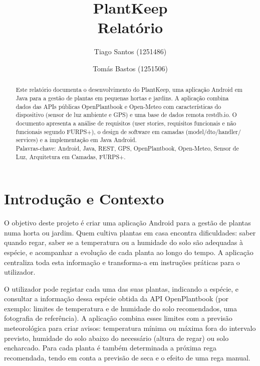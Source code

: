 \documentclass[runningheads,a4paper]{llncs}
\begin{document}
\mainmatter

\title{PlantKeep\\ Relatório}


\author{Tiago Santos (1251486) \and Tomás Bastos (1251506)}


\maketitle

\begin{abstract}
Este relatório documenta o desenvolvimento do PlantKeep, uma aplicação Android em
Java para a gestão de plantas em pequenas hortas e jardins. A aplicação combina dados
das APIs públicas OpenPlantbook e Open-Meteo com
características do dispositivo (sensor de luz ambiente e GPS) e uma
base de dados remota restdb.io. O documento
apresenta a análise de requisitos (user stories, requisitos funcionais e não
funcionais segundo FURPS+), o design de software em camadas (model/dto/handler/
services) e a implementação em Java Android.
\\[2mm]
Palavras-chave: Android, Java, REST, GPS, OpenPlantbook, Open-Meteo,
Sensor de Luz, Arquitetura em Camadas, FURPS+.
\end{abstract}

\section{Introdução e Contexto}

O objetivo deste projeto é criar uma aplicação Android para a gestão de plantas
numa horta ou jardim. Quem cultiva plantas em casa encontra dificuldades: saber
quando regar, saber se a temperatura ou a humidade do solo são adequadas à espécie,
e acompanhar a evolução de cada planta ao longo do tempo. A aplicação centraliza
toda esta informação e transforma-a em instruções práticas para o utilizador.

O utilizador pode registar cada uma das suas plantas, indicando a espécie, e
consultar a informação dessa espécie obtida da API OpenPlantbook (por exemplo:
limites de
temperatura e de humidade do solo recomendados, uma fotografia de referência). A
aplicação combina esses limites com a previsão meteorológica para criar avisos:
temperatura mínima ou máxima fora do intervalo previsto, humidade do solo abaixo do
necessário (altura de regar) ou solo encharcado. Para cada planta é também
determinada a próxima rega recomendada, tendo em conta a previsão de seca e o
efeito de uma rega manual.
\end{document}
